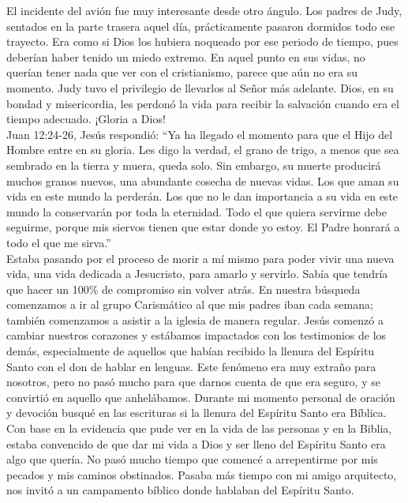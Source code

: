 \documentclass[twoside, 12pt]{book}
\begin{document}
El incidente del avión fue muy interesante desde otro ángulo. Los padres de Judy, sentados en la parte trasera aquel día, prácticamente pasaron dormidos todo ese trayecto. Era como si Dios los hubiera noqueado por ese periodo de tiempo, pues deberían haber tenido un miedo extremo. En aquel punto en sus vidas, no querían tener nada que ver con el cristianismo, parece que aún no era su momento. Judy tuvo el privilegio de llevarlos al Señor más adelante. Dios, en su bondad y misericordia, les perdonó la vida para recibir la salvación cuando era el tiempo adecuado. ¡Gloria a Dios!\\

Juan 12:24-26, Jesús respondió: “Ya ha llegado el momento para que el Hijo del Hombre entre en su gloria. Les digo la verdad, el grano de trigo, a menos que sea sembrado en la tierra y muera, queda solo. Sin embargo, su muerte producirá muchos granos nuevos, una abundante cosecha de nuevas vidas. Los que aman su vida en este mundo la perderán. Los que no le dan importancia a su vida en este mundo la conservarán por toda la eternidad. Todo el que quiera servirme debe seguirme, porque mis siervos tienen que estar donde yo estoy. El Padre honrará a todo el que me sirva.”\\

Estaba pasando por el proceso de morir a mí mismo para poder vivir una nueva vida, una vida dedicada a Jesucristo, para amarlo y servirlo. Sabía que tendría que hacer un 100\% de compromiso sin volver atrás. En nuestra búsqueda comenzamos a ir al grupo Carismático al que mis padres iban cada semana; también comenzamos a asistir a la iglesia de manera regular. Jesús comenzó a cambiar nuestros corazones y estábamos impactados con los testimonios de los demás, especialmente de aquellos que habían recibido la llenura del Espíritu Santo con el don de hablar en lenguas. Este fenómeno era muy extraño para nosotros, pero no pasó mucho para que darnos cuenta de que era seguro, y se convirtió en aquello que anhelábamos. Durante mi momento personal de oración y devoción busqué en las escrituras si la llenura del Espíritu Santo era Bíblica. Con base en la evidencia que pude ver en la vida de las personas y en la Biblia, estaba convencido de que dar mi vida a Dios y ser lleno del Espíritu Santo era algo que quería. No pasó mucho tiempo que comencé a arrepentirme por mis pecados y mis caminos obstinados. Pasaba más tiempo con mi amigo arquitecto, nos invitó a un campamento bíblico donde hablaban del Espíritu Santo.\\
\end{document}
